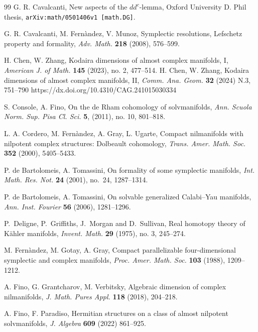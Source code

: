 \documentclass[a4paper, 11pt]{amsart}
\theoremstyle{plain}
\theoremstyle{definition}
\numberwithin{equation}{section}
\begin{document}
\begin{thebibliography}{99}
 G. R. Cavalcanti, New aspects of the $dd^c$-lemma,
Oxford University D. Phil thesis, \texttt{arXiv:math/0501406v1 [math.DG]}.

 G. R. Cavalcanti, M. Fernàndez, V. Munoz, Symplectic resolutions, Lefschetz property and formality,
\textit{Adv. Math.} \textbf{218} (2008), 576--599.

 H. Chen, W. Zhang, Kodaira dimensions of almost complex manifolds, I, {\em American J. of Math.} \textbf{145} (2023), no. 2, 477--514.
 H. Chen, W. Zhang, Kodaira dimensions of almost complex manifolds, II, {\em Comm. Ana. Geom.} \textbf{32} (2024) N.3, 751--790 
 https://dx.doi.org/10.4310/CAG.241015030334

 S. Console, A. Fino, On the de Rham cohomology of solvmanifolds, \textit{Ann. Scuola Norm. Sup. Pisa Cl. Sci.}  \textbf{5}, (2011), no. 10, 801--818.

 L. A. Cordero, M. Fernàndez, A. Gray, L. Ugarte, Compact nilmanifolds with nilpotent complex structures: Dolbeault cohomology, \textit{Trans. Amer. Math. Soc.} \textbf{352} (2000), 5405--5433.

 P. de Bartolomeis, A. Tomassini,
On formality of some symplectic manifolds,
{\em Int. Math. Res. Not.} \textbf{24} (2001), no.~24, 1287--1314.

 P. de Bartolomeis, A. Tomassini, On solvable generalized Calabi–Yau manifolds, \textit{Ann. Inst. Fourier} \textbf{56} (2006), 1281--1296. 

 P.\ Deligne, P.\ Griffiths, J.\ Morgan and D.\ Sullivan, Real homotopy theory of K\"ahler manifolds, {\em Invent. Math.} {\bf 29} (1975), no. 3, 245--274.

 M. Fernàndez, M. Gotay, A. Gray, Compact parallelizable four-dimensional symplectic and complex manifolds,
\textit{Proc. Amer. Math. Soc.} \textbf{103} (1988), 1209--1212.

 A. Fino, G. Grantcharov, M. Verbitsky, Algebraic dimension of complex nilmanifolds, \textit{ J. Math. Pures Appl.} \textbf{118} (2018), 204--218.

 A. Fino, F. Paradiso, Hermitian structures on a class of almost nilpotent solvmanifolds, \textit{J. Algebra} \textbf{609} (2022) 861--925.


\end{thebibliography}
\end{document}
